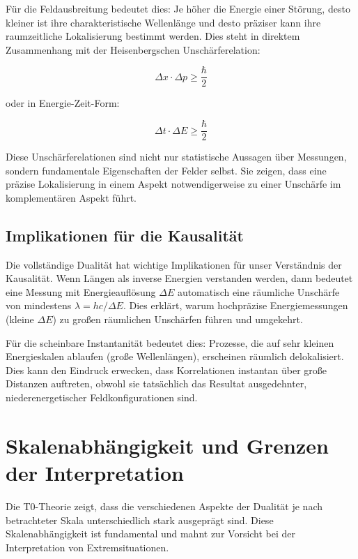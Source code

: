 	Für die Feldausbreitung bedeutet dies: Je höher die Energie einer Störung, desto kleiner ist ihre charakteristische Wellenlänge und desto präziser kann ihre raumzeitliche Lokalisierung bestimmt werden. Dies steht in direktem Zusammenhang mit der Heisenbergschen Unschärferelation:
	
	\begin{equation}
		\Delta x \cdot \Delta p \geq \frac{\hbar}{2}
	\end{equation}
	
	oder in Energie-Zeit-Form:
	
	\begin{equation}
		\Delta t \cdot \Delta E \geq \frac{\hbar}{2}
	\end{equation}
	
	Diese Unschärferelationen sind nicht nur statistische Aussagen über Messungen, sondern fundamentale Eigenschaften der Felder selbst. Sie zeigen, dass eine präzise Lokalisierung in einem Aspekt notwendigerweise zu einer Unschärfe im komplementären Aspekt führt.
	
	\subsection{Implikationen für die Kausalität}
	
	Die vollständige Dualität hat wichtige Implikationen für unser Verständnis der Kausalität. Wenn Längen als inverse Energien verstanden werden, dann bedeutet eine Messung mit Energieauflösung $\Delta E$ automatisch eine räumliche Unschärfe von mindestens $\lambda = hc/\Delta E$. Dies erklärt, warum hochpräzise Energiemessungen (kleine $\Delta E$) zu großen räumlichen Unschärfen führen und umgekehrt.
	
	Für die scheinbare Instantanität bedeutet dies: Prozesse, die auf sehr kleinen Energieskalen ablaufen (große Wellenlängen), erscheinen räumlich delokalisiert. Dies kann den Eindruck erwecken, dass Korrelationen instantan über große Distanzen auftreten, obwohl sie tatsächlich das Resultat ausgedehnter, niederenergetischer Feldkonfigurationen sind.
	
	\section{Skalenabhängigkeit und Grenzen der Interpretation}
	
	Die T0-Theorie zeigt, dass die verschiedenen Aspekte der Dualität je nach betrachteter Skala unterschiedlich stark ausgeprägt sind. Diese Skalenabhängigkeit ist fundamental und mahnt zur Vorsicht bei der Interpretation von Extremsituationen.
	
